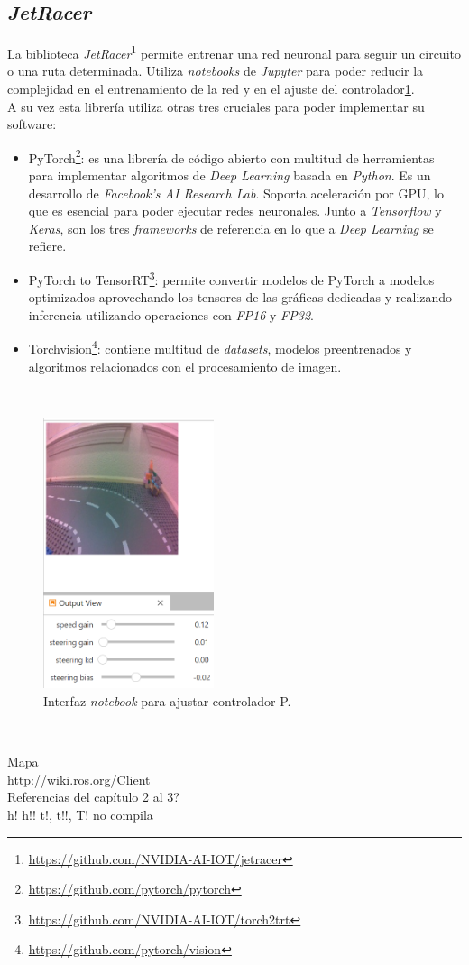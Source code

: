 \subsection{\textit{JetRacer}}
\label{subsection:jetracer}
La biblioteca \textit{JetRacer}\footnote{\url{https://github.com/NVIDIA-AI-IOT/jetracer}} permite entrenar una red neuronal para seguir un circuito o una ruta determinada. Utiliza \textit{notebooks} de \textit{Jupyter} para poder reducir la complejidad en el entrenamiento de la red y en el ajuste del controlador\ref{fig:livejetracer}.\\

A su vez esta librería utiliza otras tres cruciales para poder implementar su software:

\begin{itemize}
	\item PyTorch\footnote{\url{https://github.com/pytorch/pytorch}}: es una librería de código abierto con multitud de herramientas para implementar algoritmos de \textit{Deep Learning} basada en \textit{Python}\cite{autopilottesla}. Es un desarrollo de \textit{Facebook's AI Research Lab}. Soporta aceleración por GPU, lo que es esencial para poder ejecutar redes neuronales. Junto a \textit{Tensorflow} y \textit{Keras}, son los tres \textit{frameworks} de referencia en lo que a \textit{Deep Learning} se refiere.
	\item PyTorch to TensorRT\footnote{\url{https://github.com/NVIDIA-AI-IOT/torch2trt}}: permite convertir modelos de PyTorch a modelos optimizados aprovechando los tensores de las gráficas dedicadas y realizando inferencia utilizando operaciones con \textit{FP16} y \textit{FP32}.
	\item Torchvision\footnote{\url{https://github.com/pytorch/vision}}: contiene multitud de \textit{datasets}, modelos preentrenados y algoritmos relacionados con el procesamiento de imagen.
\end{itemize}\

\begin{figure} [h!]
	\begin{center}
		\includegraphics[width=5cm]{figs/livejetracer}
	\end{center}
	\caption{Interfaz \textit{notebook} para ajustar controlador P.}
	\label{fig:livejetracer}
\end{figure}\

Mapa\\
http://wiki.ros.org/Client%
\\Referencias del capítulo 2 al 3?\\
h! h!! t!, t!!, T! no compila